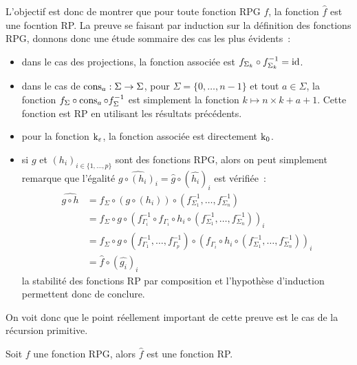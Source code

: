 L'objectif est donc de montrer que pour toute fonction RPG $f$, la fonction
$\hat f$ est une focntion RP. La preuve se faisant par induction sur la
définition des fonctions RPG, donnons donc une étude sommaire des cas les
plus évidents~:
\begin{itemize}
\item dans le cas des projections, la fonction associée est
  $f_{\Sigma_k}\circ f^{-1}_{\Sigma_k} = \operatorname{id}$.
\item dans le cas de $\operatorname{cons}_a : \Sigma \to \Sigma$, pour
  $\Sigma = \{0,\ldots,n-1\}$ et tout $a \in \Sigma$,
  la fonction $f_\Sigma\circ \operatorname{cons}_a\circ f_\Sigma^{-1}$ est simplement la
  fonction $k \mapsto n\times k + a + 1$. Cette fonction est RP en utilisant les
  résultats précédents.
\item pour la fonction $\operatorname{k}_\varepsilon$, la fonction associée est directement
  $\operatorname{k}_0$.
\item si $g$ et $(h_i)_{i \in \{1,\ldots,p\}}$ sont des fonctions RPG,
  alors on peut simplement remarque que l'égalité
  $\widehat{g\circ (h_i)_i} = \hat g \circ (\hat{h_i})_i$
  est vérifiée~:
  \begin{align*}
    \widehat{g\circ h} &= f_\Sigma\circ (g \circ (h_i)) \circ
    (f_{\Sigma_1}^{-1},\ldots,f_{\Sigma_n}^{-1})\\
    &= f_\Sigma\circ g \circ (f_{\Gamma_i}^{-1}\circ f_{\Gamma_i}\circ h_i\circ
    (f_{\Sigma_1}^{-1},\ldots,f_{\Sigma_n}^{-1}))_i\\
    &= f_\Sigma\circ g \circ (f_{\Gamma_1}^{-1},\ldots,f_{\Gamma_p}^{-1})
    \circ (f_{\Gamma_i}\circ h_i\circ
    (f_{\Sigma_1}^{-1},\ldots,f_{\Sigma_n}^{-1}))_i\\
    &= \hat f \circ (\hat{g_i})_i
  \end{align*}
  la stabilité des fonctions RP par composition et l'hypothèse d'induction
  permettent donc de conclure.
\end{itemize}

On voit donc que le point réellement important de cette preuve est le cas de
la récursion primitive.

\begin{lemma}
  Soit $f$ une fonction RPG, alors $\hat f$ est une fonction RP.
\end{lemma}

